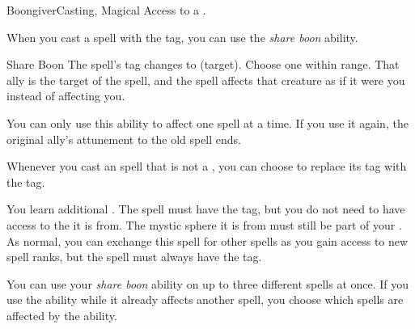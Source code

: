     \begin{magicalfeat}{Boongiver}{Casting, Magical}
        \featpre Access to a .

         When you cast a spell with the  tag, you can use the \textit{share boon} ability.
        \begin{magicalactiveability}{Share Boon}
            \rankline
            The spell's  tag changes to  (target).
            Choose one  within \rngmed range.
            That ally is the target of the spell, and the spell affects that creature as if it were you instead of affecting you.

            You can only use this ability to affect one spell at a time.
            If you use it again, the original ally's attunement to the old spell ends.
        \end{magicalactiveability}

         Whenever you cast an  spell that is not a , you can choose to replace its  tag with the  tag.

         You learn additional .
        The spell must have the  tag, but you do not need to have access to the  it is from.
        The mystic sphere it is from must still be part of your .
        As normal, you can exchange this spell for other spells as you gain access to new spell ranks, but the spell must always have the  tag.

         You can use your \textit{share boon} ability on up to three different spells at once.
        If you use the ability while it already affects another spell, you choose which spells are affected by the ability.
    \end{magicalfeat}

